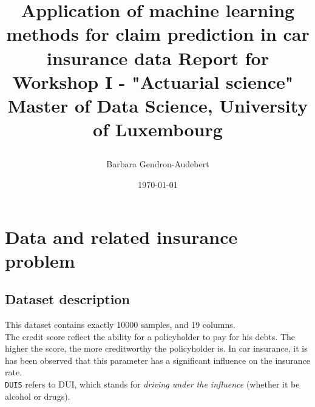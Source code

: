 \documentclass[a4paper,11pt]{article}
\title{%
    \begin{minipage}\linewidth
        \centering
        \Huge{\textbf{Application of machine learning methods for claim prediction in car insurance data}}
        \vskip75pt
        \huge{Report for Workshop I - "Actuarial science" \\ Master of Data Science, University of Luxembourg}
    \end{minipage}
}
\author{\Large{Barbara {\sc Gendron-Audebert}}}
\date\today
\begin{document}
\maketitle
\newpage



\section{Data and related insurance problem} 

\subsection{Dataset description}

This dataset contains exactly 10000 samples, and 19 columns.\\

\noindent The credit score reflect the ability for a policyholder to pay for his debts. The higher the score, the more creditworthy the policyholder is. In car insurance, it is has been observed that this parameter has a significant influence on the insurance rate.\\
{\tt DUIS} refers to DUI, which stands for \textsl{driving under the influence} (whether it be alcohol or drugs).
\end{document}
